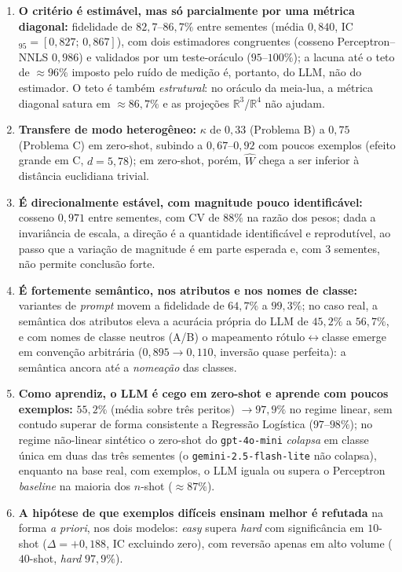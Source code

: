 \documentclass[12pt,a4paper]{article}
\newcommand{\West}{\ensuremath{\hat{W}}}   %
\begin{document}
\begin{enumerate}
  \item \textbf{O critério é estimável, mas só parcialmente por uma métrica diagonal:}
    fidelidade de $82{,}7$–$86{,}7\%$ entre sementes (média $0{,}840$,
    IC$_{95}=[0{,}827;\,0{,}867]$), com
    dois estimadores congruentes (cosseno Perceptron--NNLS $0{,}986$) e validados por um
    teste-oráculo ($95$–$100\%$); a lacuna até o teto de $\approx 96\%$ imposto pelo ruído
    de medição é, portanto, do LLM, não do estimador. O teto é também \emph{estrutural}: no
    oráculo da meia-lua, a métrica diagonal satura em $\approx 86{,}7\%$ e as projeções
    $\mathbb{R}^3$/$\mathbb{R}^4$ não ajudam.
  \item \textbf{Transfere de modo heterogêneo:} $\kappa$ de $0{,}33$ (Problema B) a $0{,}75$
    (Problema C) em zero-shot, subindo a $0{,}67$–$0{,}92$ com poucos exemplos (efeito
    grande em C, $d=5{,}78$); em zero-shot, porém, \West{} chega a ser inferior à distância
    euclidiana trivial.
  \item \textbf{É direcionalmente estável, com magnitude pouco identificável:} cosseno
    $0{,}971$ entre sementes, com CV de $88\%$ na razão dos pesos; dada a invariância de
    escala, a direção é a quantidade identificável e reprodutível, ao passo que a variação de
    magnitude é em parte esperada e, com $3$ sementes, não permite conclusão forte.
  \item \textbf{É fortemente semântico, nos atributos e nos nomes de classe:}
    variantes de \emph{prompt} movem a fidelidade de $64{,}7\%$ a $99{,}3\%$; no caso real,
    a semântica dos atributos eleva a acurácia própria do LLM de $45{,}2\%$ a
    $56{,}7\%$, e com nomes de classe neutros (A/B) o mapeamento rótulo$\leftrightarrow$classe
    emerge em convenção arbitrária ($0{,}895 \to 0{,}110$, inversão quase perfeita): a
    semântica ancora até a \emph{nomeação} das classes.
  \item \textbf{Como aprendiz, o LLM é cego em zero-shot e aprende com poucos exemplos:}
    $55{,}2\%$ (média sobre três peritos) $\to 97{,}9\%$ no regime linear, sem contudo
    superar de forma consistente a Regressão Logística
    ($97$–$98\%$); no regime não-linear sintético o zero-shot do \texttt{gpt-4o-mini}
    \emph{colapsa} em classe única em duas das três sementes (o
    \texttt{gemini-2.5-flash-lite} não colapsa), enquanto na base real, com exemplos, o LLM
    iguala ou supera o Perceptron \emph{baseline} na maioria dos $n$-shot ($\approx 87\%$).
  \item \textbf{A hipótese de que exemplos difíceis ensinam melhor é refutada} na forma
    \emph{a priori}, nos dois modelos: \emph{easy} supera \emph{hard} com significância em
    $10$-shot ($\Delta = +0{,}188$, IC excluindo zero), com reversão apenas em alto volume
    ($40$-shot, \emph{hard} $97{,}9\%$).
\end{enumerate}
\end{document}
